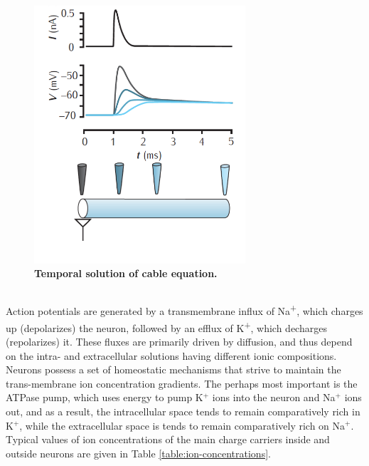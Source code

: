 \begin{figure}[!ht]
\begin{center}
\includegraphics[width=0.7\textwidth]{Figures/Neuron/Temporalcable.png}
\end{center}
\caption{\textbf{Temporal solution of cable equation.}
}
\label{Neuron:fig:temporalrall}
\end{figure}




\subsection{}
Action potentials are generated by a transmembrane influx of Na\textsuperscript{+}, which charges up (depolarizes) the neuron, 
followed by an efflux of K\textsuperscript{+}, which decharges (repolarizes) it. These fluxes are primarily driven by diffusion, and thus depend on the intra- and extracellular solutions having different ionic compositions. Neurons possess a set of homeostatic mechanisms that strive to maintain the trans-membrane ion concentration gradients. The perhaps most important is the ATPase pump, which uses energy to pump K$^+$ ions into the neuron and Na$^+$ ions out, and as a result, the intracellular space tends to remain comparatively rich in K$^+$, while the extracellular space is tends to remain comparatively rich on Na$^+$. Typical values of ion concentrations of the main charge carriers inside and outside neurons are given in Table \ref{table:ion-concentrations}. 


